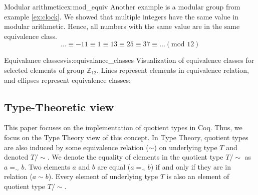 \begin{example}{Modular arithmetic}{ex:mod_equiv}
Another example is a modular group from example \ref{ex:clock}. We showed that multiple integers have the same value in modular arithmetic. Hence, all numbers with the same value are in the same equivalence class.
$$ \dots \equiv -11 \equiv 1 \equiv 13 \equiv 25 \equiv 37 \equiv \dots (\textrm{mod } 12) $$
\end{example}
\begin{vis}[G]{Equivalance classes}{vis:equivalance_classes}
Visualization of equivalence classes for selected elements of group $\mathbb{Z}_{12}$. Lines represent elements in equivalence relation, and ellipses represent equivalence classes:
\begin{center}
\end{center}
\end{vis}

\subsection{Type-Theoretic view}
This paper focuses on the implementation of quotient types in Coq. Thus, we focus on the Type Theory view of this concept. In Type Theory, quotient types are also induced by some equivalence relation ($\sim$) on underlying type $T$ and denoted $T/\sim$. We denote the equality of elements in the quotient type $T/\sim$ as $a =_\sim b$. Two elements $a$ and $b$ are equal ($a =_\sim b$) if and only if they are in relation ($a \sim b$). Every element of underlying type $T$ is also an element of quotient type $T/\sim$.

